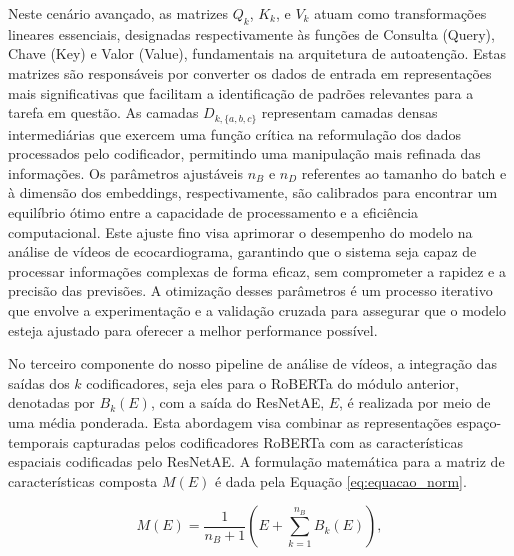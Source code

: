 Neste cenário avançado, as matrizes \( Q _k \), \( K_k \), e \( V_k \) atuam como transformações lineares essenciais, designadas respectivamente às funções de Consulta (Query), Chave (Key) e Valor (Value), fundamentais na arquitetura de autoatenção. Estas matrizes são responsáveis por converter os dados de entrada em representações mais significativas que facilitam a identificação de padrões relevantes para a tarefa em questão. As camadas \( D_{k,\{a,b,c\}} \)  representam camadas densas intermediárias que exercem uma função crítica na reformulação dos dados processados pelo codificador, permitindo uma manipulação mais refinada das informações. Os parâmetros ajustáveis \( n_B \) e \( n_D \) referentes ao tamanho do batch e à dimensão dos embeddings, respectivamente, são  calibrados para encontrar um equilíbrio ótimo entre a capacidade de processamento e a eficiência computacional. Este ajuste fino visa aprimorar o desempenho do modelo na análise de vídeos de ecocardiograma, garantindo que o sistema seja capaz de processar informações complexas de forma eficaz, sem comprometer a rapidez e a precisão das previsões. A otimização desses parâmetros é um processo iterativo que envolve a experimentação e a validação cruzada para assegurar que o modelo esteja ajustado para oferecer a melhor performance possível.

No terceiro componente do nosso pipeline de análise de vídeos, a integração das saídas dos $k$ codificadores, seja eles para o RoBERTa do módulo anterior, denotadas por $B_k(E)$, com a saída do ResNetAE, $E$, é realizada por meio de uma média ponderada. Esta abordagem visa combinar  as representações espaço-temporais capturadas pelos codificadores RoBERTa com as características espaciais codificadas pelo ResNetAE. A formulação matemática para a matriz de características composta $M(E)$ é dada pela Equação \ref{eq:equacao_norm}.


\begin{equation}
M(E) = \frac{1}{n_B + 1} \left( E + \sum_{k=1}^{n_B} B_k(E) \right),
\label{eq:equacao_norm}
\end{equation}

